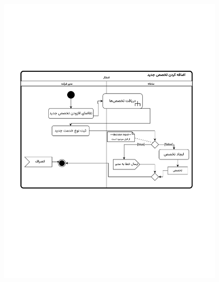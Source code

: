 \begin{figure}[ht!]
	\centering
	\includegraphics[scale=0.8, page=1]{figs/OOD-activity-nokhedmatjadid.pdf}
\end{figure}
\FloatBarrier
\newpage


